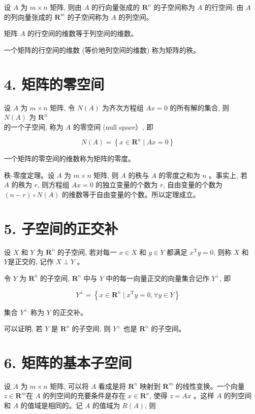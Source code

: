 \documentclass[10pt]{article}
\begin{document}
设 $A$ 为 $m \times n$ 矩阵, 则由 $A$ 的行向量张成的 $\boldsymbol{R}^{n}$ 的子空间称为 $A$ 的行空间; 由 $A$ 的列向量张成的 $\boldsymbol{R}^{m}$ 的子空间称为 $A$ 的列空间。

矩阵 $A$ 的行空间的维数等于列空间的维数。

一个矩阵的行空间的维数 (等价地列空间的维数) 称为矩阵的秩。

\section*{4. 矩阵的零空间}
设 $A$ 为 $m \times n$ 矩阵, 令 $N(A)$ 为齐次方程组 $A x=0$ 的所有解的集合, 则 $N(A)$ 为 $\boldsymbol{R}^{n}$\\
的一个子空间, 称为 $A$ 的零空间 (null space）, 即


\begin{equation*}
N(A)=\left\{x \in \boldsymbol{R}^{n} \mid A x=0\right\} \tag{D.1}
\end{equation*}


一个矩阵的零空间的维数称为矩阵的零度。

秩-零度定理。设 $A$ 为 $m \times n$ 矩阵, 则 $A$ 的秩与 $A$ 的零度之和为 $n$ 。事实上, 若 $A$ 的秩为 $r$, 则方程组 $A x=0$ 的独立变量的个数为 $r$, 自由变量的个数为 $(n-r) \circ N(A)$ 的维数等于自由变量的个数。所以定理成立。

\section*{5. 子空间的正交补}
设 $X$ 和 $Y$ 为 $\boldsymbol{R}^{n}$ 的子空间, 若对每一 $x \in X$ 和 $y \in Y$ 都满足 $x^{\mathrm{T}} y=0$, 则称 $X$ 和 $Y$是正交的, 记作 $X \perp Y$ 。

令 $Y$ 为 $\boldsymbol{R}^{n}$ 的子空间, $\boldsymbol{R}^{n}$ 中与 $Y$ 中的每一向量正交的向量集合记作 $Y^{\perp}$, 即


\begin{equation*}
Y^{\perp}=\left\{x \in \boldsymbol{R}^{n} \mid x^{\mathrm{T}} y=0, \forall y \in Y\right\} \tag{D.2}
\end{equation*}


集合 $Y^{\perp}$ 称为 $Y$ 的正交补。

可以证明, 若 $Y$ 是 $\boldsymbol{R}^{n}$ 的子空间, 则 $Y^{\perp}$ 也是 $\boldsymbol{R}^{n}$ 的子空间。

\section*{6. 矩阵的基本子空间}
设 $A$ 为 $m \times n$ 矩阵, 可以将 $A$ 看成是将 $\boldsymbol{R}^{n}$ 映射到 $\boldsymbol{R}^{m}$ 的线性变换。一个向量 $z \in \boldsymbol{R}^{m}$在 $A$ 的列空间的充要条件是存在 $x \in \boldsymbol{R}^{n}$, 使得 $z=A x$ 。这样 $A$ 的列空间和 $A$ 的值域是相同的。记 $A$ 的值域为 $R(A)$, 则
\end{document}
